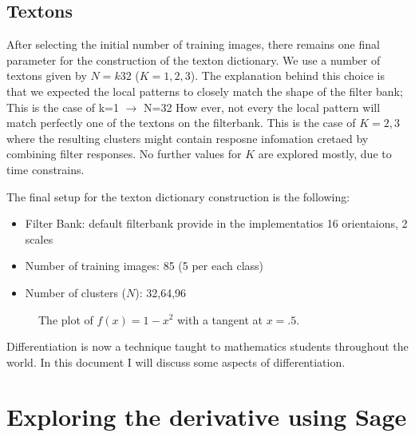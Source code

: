 \documentclass[a4paper]{article}
\begin{document}
\subsection{Textons}
After selecting the initial number of training images, there remains one final parameter for the construction of the texton dictionary. We use a number of textons given by $N=k32$ ($K={1,2,3}$). The explanation behind this choice is that we expected the local patterns to closely match the shape of the filter bank; This is the case of k=1 $\rightarrow$ N=32 
How ever, not every the local pattern will match perfectly one of the textons on the filterbank. This is the case of $K={2,3}$ where the resulting clusters might contain resposne infomation cretaed by combining filter responses. No further values for $K$ are explored mostly, due to time constrains.
 
The final setup for the texton dictionary construction is the following:

\begin{itemize}
	\item Filter Bank: default filterbank provide in the implementatios 16 orientaions, 2 scales
	\item Number of training images: 85 (5 per each class)
	\item Number of clusters ($N$):  32,64,96
\end{itemize}


\begin{figure}[!htbp]
\begin{center}
\end{center}
\caption{The plot of $f(x)=1-x^2$ with a tangent at $x=.5$.}\label{exampleplot}
\end{figure}

Differentiation is now a technique taught to mathematics students throughout the world. In this document I will discuss some aspects of differentiation.

\section{Exploring the derivative using Sage}
\end{document}
